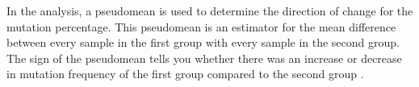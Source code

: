 % 
In the analysis, a pseudomean is used to determine the direction of change for the mutation percentage.
This pseudomean is an estimator for the mean difference between every sample in the first group with every sample in the second group.
The sign of the pseudomean tells you whether there was an increase or decrease in mutation frequency of the first group compared to the second group \cite{thercoreteamWilcoxtestWilcoxonRank}.





